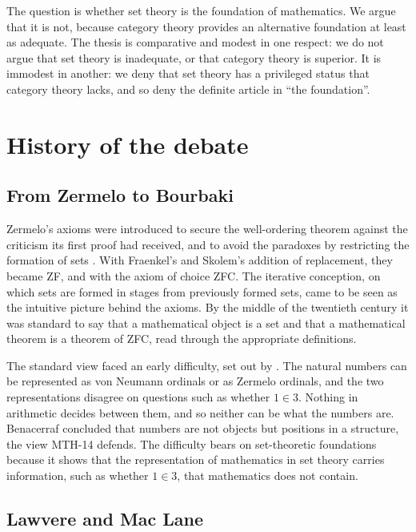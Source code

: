 \documentclass{situationist-preprint}
\begin{document}
The question is whether set theory is the foundation of mathematics. We argue that it is not, because category theory provides an alternative foundation at least as adequate. The thesis is comparative and modest in one respect: we do not argue that set theory is inadequate, or that category theory is superior. It is immodest in another: we deny that set theory has a privileged status that category theory lacks, and so deny the definite article in \enquote{the foundation}.

\section{History of the debate}\label{s:history}

\subsection{From Zermelo to Bourbaki}

Zermelo's axioms were introduced to secure the well-ordering theorem against the criticism its first proof had received, and to avoid the paradoxes by restricting the formation of sets \citep{Zermelo1908}. With Fraenkel's and Skolem's addition of replacement, they became ZF, and with the axiom of choice ZFC. The iterative conception, on which sets are formed in stages from previously formed sets, came to be seen as the intuitive picture behind the axioms. By the middle of the twentieth century it was standard to say that a mathematical object is a set and that a mathematical theorem is a theorem of ZFC, read through the appropriate definitions.

The standard view faced an early difficulty, set out by \citet{Benacerraf1965}. The natural numbers can be represented as von Neumann ordinals or as Zermelo ordinals, and the two representations disagree on questions such as whether $1 \in 3$. Nothing in arithmetic decides between them, and so neither can be what the numbers are. Benacerraf concluded that numbers are not objects but positions in a structure, the view MTH-14 defends. The difficulty bears on set-theoretic foundations because it shows that the representation of mathematics in set theory carries information, such as whether $1 \in 3$, that mathematics does not contain.

\subsection{Lawvere and Mac Lane}
\end{document}
